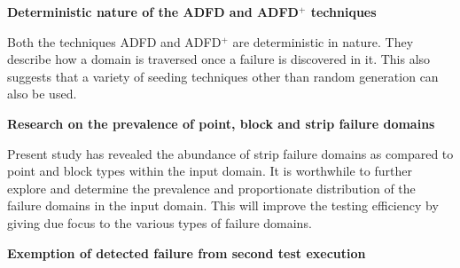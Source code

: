 \textbf{Deterministic nature of the ADFD and ADFD$^+$ techniques}

Both the techniques ADFD and ADFD$^+$ are deterministic in nature. They describe how a domain is traversed once a failure is discovered in it. This also suggests that a variety of seeding techniques other than random generation can also be used.


\textbf{Research on the prevalence of point, block and strip failure domains}

Present study has revealed the abundance of strip failure domains as compared to point and block types within the input domain. It is worthwhile to further explore and determine the prevalence and proportionate distribution of the failure domains in the input domain. This will improve the testing efficiency by giving due focus to the various types of failure domains.



\textbf{Exemption of detected failure from second test execution}



